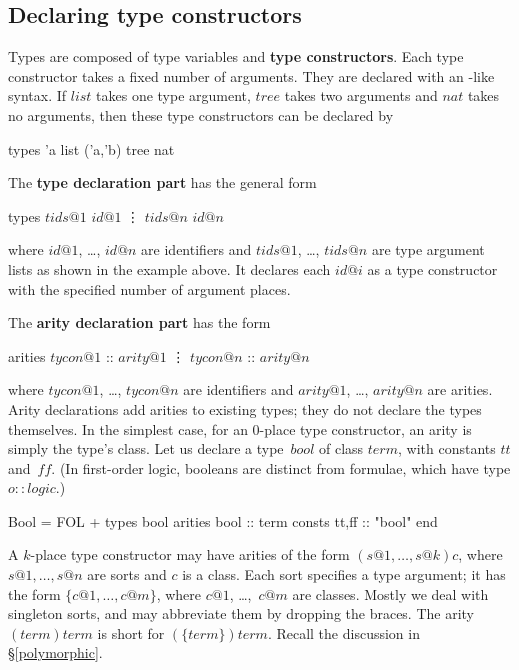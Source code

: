 \subsection{Declaring type constructors}
%
Types are composed of type variables and {\bf type constructors}.  Each
type constructor takes a fixed number of arguments.  They are declared
with an \ML-like syntax.  If $list$ takes one type argument, $tree$ takes
two arguments and $nat$ takes no arguments, then these type constructors
can be declared by
\begin{ttbox}
types 'a list
      ('a,'b) tree
      nat
\end{ttbox}

The {\bf type declaration part} has the general form
\begin{ttbox}
types   \(tids@1\) \(id@1\)
        \vdots
        \(tids@n\) \(id@n\)
\end{ttbox}
where $id@1$, \ldots, $id@n$ are identifiers and $tids@1$, \ldots, $tids@n$
are type argument lists as shown in the example above.  It declares each
$id@i$ as a type constructor with the specified number of argument places.

The {\bf arity declaration part} has the form
\begin{ttbox}
arities \(tycon@1\) :: \(arity@1\)
        \vdots
        \(tycon@n\) :: \(arity@n\)
\end{ttbox}
where $tycon@1$, \ldots, $tycon@n$ are identifiers and $arity@1$, \ldots,
$arity@n$ are arities.  Arity declarations add arities to existing
types; they do not declare the types themselves.
In the simplest case, for an 0-place type constructor, an arity is simply
the type's class.  Let us declare a type~$bool$ of class $term$, with
constants $tt$ and~$ff$.  (In first-order logic, booleans are
distinct from formulae, which have type $o::logic$.)
\begin{ttbox}
Bool = FOL +
types   bool
arities bool    :: term
consts  tt,ff   :: "bool"
end
\end{ttbox}
A $k$-place type constructor may have arities of the form
$(s@1,\ldots,s@k)c$, where $s@1,\ldots,s@n$ are sorts and $c$ is a class.
Each sort specifies a type argument; it has the form $\{c@1,\ldots,c@m\}$,
where $c@1$, \dots,~$c@m$ are classes.  Mostly we deal with singleton
sorts, and may abbreviate them by dropping the braces.  The arity
$(term)term$ is short for $(\{term\})term$.  Recall the discussion in
\S\ref{polymorphic}.

